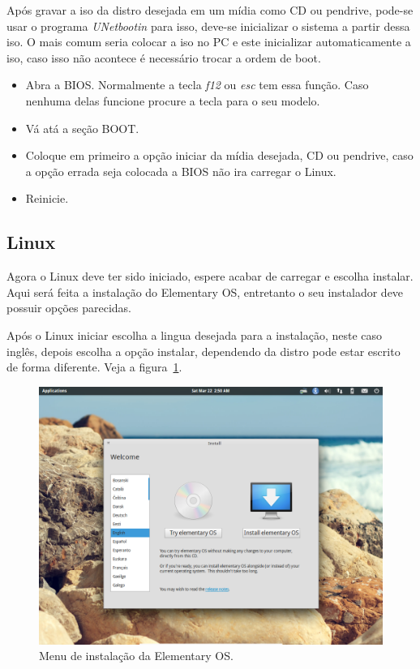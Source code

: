 \documentclass{handout_utfpr}
\begin{document}
Após gravar a iso da distro desejada em um mídia como CD ou pendrive, pode-se usar o programa \emph{UNetbootin} para isso, deve-se inicializar o sistema a partir dessa iso. O mais comum seria colocar a iso no PC e este inicializar automaticamente a iso, caso isso não acontece é necessário trocar a ordem de boot.

\begin{itemize}\label{itm:boot-order}
    \item Abra a BIOS\@. Normalmente a tecla \emph{f12} ou \emph{esc} tem essa função. Caso nenhuma delas funcione procure a tecla para o seu modelo.
    \item Vá atá a seção BOOT.
    \item Coloque em primeiro a opção iniciar da mídia desejada, CD ou pendrive, caso a opção errada seja colocada a BIOS não ira carregar o Linux.
    \item Reinicie.
\end{itemize}

\subsection{Linux}

Agora o Linux deve ter sido iniciado, espere acabar de carregar e escolha instalar. Aqui será feita a instalação do Elementary OS, entretanto o seu instalador deve possuir opções parecidas.

Após o Linux iniciar escolha a lingua desejada para a instalação, neste caso inglês, depois escolha a opção instalar, dependendo da distro pode estar escrito de forma diferente. Veja a figura~\ref{fig:elementary-menu}.

\begin{figure}[H]
  \centering
  \includegraphics[scale=.3]{imagens/elementary-install-01.png}
  \caption{Menu de instalação da Elementary OS\@.}
  \label{fig:elementary-menu}
\end{figure}
\end{document}
